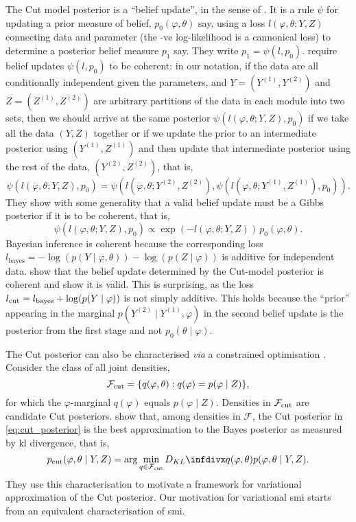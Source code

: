 The Cut model posterior is a ``belief update'', in the sense of \cite{Bissiri2016}.
It is a rule $\psi$ for updating a prior measure of belief, $p_0(\varphi,\theta)$ say, using a loss $l(\varphi,\theta;Y,Z)$ connecting data and parameter (the -ve log-likelihood is a cannonical loss) to determine a posterior belief measure $p_1$ say.
They write $p_1=\psi(l,p_0)$.
\cite{Bissiri2016} require belief updates $\psi(l,p_0)$ to be coherent: in our notation, if the data are all conditionally independent given the parameters, and $Y=(Y^{(1)},Y^{(2)})$ and $Z=(Z^{(1)},Z^{(2)})$ are arbitrary partitions of the data in each module into two sets, then we should arrive at the same posterior $\psi(l(\varphi,\theta;Y,Z),p_0)$ if we take all the data $(Y,Z)$ together or if we update the prior to an intermediate posterior using $(Y^{(1)},Z^{(1)})$ and then update that intermediate posterior using the rest of the data, $(Y^{(2)},Z^{(2)})$, that is,
\begin{equation}\label{eq:coherent_bissiri}
  \psi(l(\varphi,\theta;Y,Z),p_0)=\psi(l(\varphi,\theta;Y^{(2)},Z^{(2)}),\psi(l(\varphi,\theta;Y^{(1)},Z^{(1)}),p_0)).
\end{equation}
They show with some generality that a valid belief update must be a Gibbs posterior if it is to be coherent, that is,
\[
  \psi(l(\varphi,\theta;Y,Z),p_0)\propto \exp(-l(\varphi,\theta;Y,Z))\,p_0(\varphi,\theta).
\]
Bayesian inference is coherent because the corresponding loss $l_{\text{bayes}}=-\log(p(Y\mid \varphi,\theta))-\log(p(Z\mid \varphi))$ is additive for independent data.
\cite{Carmona2020smi} show that the belief update determined by the Cut-model posterior is coherent and \cite{Nicholls2022smi} show it is valid.
This is surprising, as the loss $l_{\operatorname{\text{cut}}}=l_{\text{bayes}}+\log(p(Y\mid \varphi))$ is not simply additive.
This holds because the ``prior'' appearing in the marginal $p(Y^{(2)}\mid Y^{(1)},\varphi)$ in the second belief update is the posterior from the first stage and not $p_0(\theta\mid \varphi)$.

The Cut posterior can also be characterised {\it via} a constrained optimisation \citep{Yu2021variationalcut}.
Consider the class of all joint densities,
\[
  \mathcal{F}_{\operatorname{\text{cut}}} = \{q(\varphi,\theta) : q(\varphi) = p(\varphi\mid Z)\},
\]
for which the $\varphi$-marginal $q(\varphi)$ equals $p(\varphi\mid Z)$.
Densities in $\mathcal{F}_{\operatorname{\text{cut}}}$ are candidate Cut posteriors.
\cite{Yu2021variationalcut} show that, among densities in $\mathcal{F}$, the Cut posterior in \cref{eq:cut_posterior} is the best approximation to the Bayes posterior as measured by \acrshort*{kl} divergence, that is,
\begin{equation}\label{eq:cut_constrained_optim}
  p_{\cut}(\varphi,\theta \mid Y,Z)=\arg\min_{q\in \mathcal{F}_{\cut}} \kl{q(\varphi,\theta)}{ p(\varphi,\theta\mid Y,Z)}.
\end{equation}
They use this characterisation to motivate a framework for variational approximation of the Cut posterior.
Our motivation for variational \acrshort*{smi} starts from an equivalent characterisation of \acrshort*{smi}.

